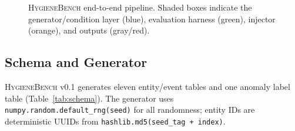 \documentclass[conference]{IEEEtran}
\newcommand{\hb}{\textsc{HygieneBench}\xspace}
\newcommand{\fp}{$\blacktriangleright$\xspace}   %
\begin{document}
\begin{figure}[t]
{%
}%
\caption{\hb end-to-end pipeline. Shaded boxes indicate the generator/condition
  layer (blue), evaluation harness (green), injector (orange), and outputs (gray/red).}
\label{fig:architecture}
\end{figure}

\subsection{Schema and Generator}

\hb v0.1 generates eleven entity/event tables and one anomaly label table
(Table~\ref{tab:schema}). The generator uses \texttt{numpy.random.default\_rng(seed)}
for all randomness; entity IDs are deterministic UUIDs from
\texttt{hashlib.md5(seed\_tag + index)}.
\end{document}
